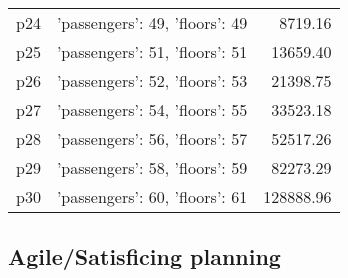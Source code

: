 \documentclass{article}
\begin{document}
\begin{center}
\begin{tabular}{@{}l|r|r@{}}
  p24&{'passengers': 49, 'floors': 49}&8719.16\\
  p25&{'passengers': 51, 'floors': 51}&13659.40\\
  p26&{'passengers': 52, 'floors': 53}&21398.75\\
  p27&{'passengers': 54, 'floors': 55}&33523.18\\
  p28&{'passengers': 56, 'floors': 57}&52517.26\\
  p29&{'passengers': 58, 'floors': 59}&82273.29\\
  p30&{'passengers': 60, 'floors': 61}&128888.96
                            \end{tabular}
                            \end{center}
                    

                                \subsection*{Agile/Satisficing planning}
                                
\end{document}
